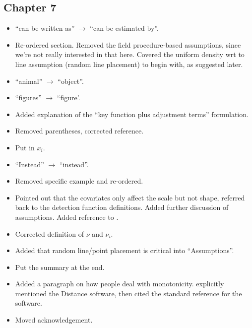 \subsection{Chapter 7}
\begin{itemize}
\item {} ``can be written as'' $\rightarrow$ ``can be estimated by''.
\item {} Re-ordered section. Removed the field procedure-based assumptions, since we're not really interested in that here. Covered the uniform density wrt to line assumption (random line placement) to begin with, as suggested later.
\item {} ``animal'' $\rightarrow$ ``object''.
\item {} ``figures'' $\rightarrow$ ``figure'.
\item {} Added explanation of the ``key function plus adjustment terms'' formulation.
\item {} Removed parentheses, corrected reference.
\item {} Put in $x_i$.
\item {} ``Instead'' $\rightarrow$ ``instead''.
\item {} Removed specific example and re-ordered.
\item {} Pointed out that the covariates only affect the scale but not shape, referred back to the detection function definitions. Added further discussion of assumptions.  Added reference to .
\item {} Corrected definition of $\nu$ and $\nu_i$.
\item {} Added that random line/point placement is critical into ``Assumptions''.
\item {} Put the summary at the end.
\item {} Added a paragraph on how people deal with monotonicity.  explicitly mentioned the Distance software, then cited the standard reference for the software.
\item {} Moved acknowledgement.
\end{itemize}

